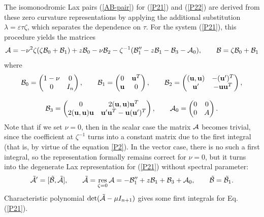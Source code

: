 \documentclass[11pt]{article}
\theoremstyle{plain}
\theoremstyle{definition}
\begin{document}
The isomonodromic Lax pairs (\ref{AB-pair}) for (\ref{P21}) and (\ref{P22}) are derived from these zero curvature representations by applying the additional substitution $\lambda=\varepsilon\tau\zeta$, which separates the dependence on $\tau$. For the system (\ref{P21}), this procedure yields the matrices
\begin{equation}\label{P2AB}
 {\cal A}=-\nu^2\zeta(\zeta{\cal B}_0+{\cal B}_1)+z{\cal B}_0-\nu{\cal B}_2 
 -\zeta^{-1}({\cal B}''_1-z{\cal B}_1-{\cal B}_3-{\cal A}_0),\qquad
 {\cal B}=\zeta{\cal B}_0+{\cal B}_1
\end{equation}
where
\begin{equation}\label{P12AB}
\begin{gathered}
 {\cal B}_0=\begin{pmatrix} 1-\nu & 0\\ 0 & I_n \end{pmatrix},\qquad
 {\cal B}_1=\begin{pmatrix} 0 & {\bf u}^T\\ {\bf u} & 0 \end{pmatrix},\qquad
 {\cal B}_2=\begin{pmatrix} ({\bf u},{\bf u}) & -({\bf u}')^T\\ {\bf u}' & -{\bf u}{\bf u}^T \end{pmatrix},\\[3mm]
 {\cal B}_3=\begin{pmatrix} 0 & 2({\bf u},{\bf u}){\bf u}^T\\ 2({\bf u},{\bf u}){\bf u} & {\bf u}'{\bf u}^T-{\bf u}({\bf u}')^T \end{pmatrix},\qquad
 {\cal A}_0=\begin{pmatrix} 0 & 0\\ 0 & A \end{pmatrix}.
\end{gathered}
\end{equation}
Note that if we set $\nu=0$, then in the scalar case the matrix ${\cal A}$ becomes trivial, since the coefficient at $\zeta^{-1}$ turns into a constant matrix due to the first integral (that is, by virtue of the equation \ref{P2}). In the vector case, there is no such a first integral, so the representation formally remains correct for $\nu=0$, but it turns into the degenerate Lax representation for (\ref{P21}) without spectral parameter:
\[
 \tilde{\cal A}'=[\tilde{\cal B},\tilde{\cal A}],\qquad 
 \tilde{\cal A}=\operatorname*{res}_{\zeta=0}{\cal A}
  =-{\cal B}''_1+z{\cal B}_1+{\cal B}_3+{\cal A}_0,\qquad
 \tilde{\cal B}=\tilde{\cal B}_1. 
\]
Characteristic polynomial $\det(\tilde{\cal A}-\mu I_{n+1})$ gives some first integrals for Eq. (\ref{P21}).
\end{document}
